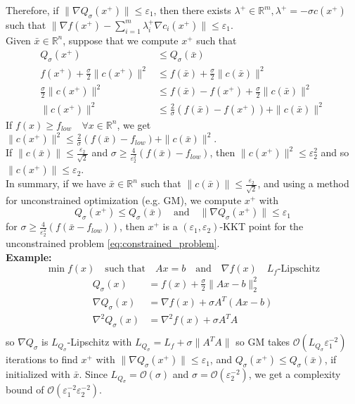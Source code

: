 \documentclass[12pt, openany]{report}
\newcommand{\R}{\mathbb{R}}
\renewcommand{\O}{\mathcal{O}}
\theoremstyle{definition}
\begin{document}
Therefore, if $\| \nabla Q_{\sigma} (x^+) \| \leq \varepsilon_1$, then there exists $\lambda^+ \in \R^m, \lambda^+ = - \sigma c(x^+)$ such that $\|\nabla f(x^+) - \displaystyle \sum_{i=1}^{m} \lambda_i^+ \nabla c_i(x^+)\| \leq \varepsilon_1$.\\
Given $\bar{x} \in \R^n$, suppose that we compute $x^+$ such that
\begin{equation}
	\begin{aligned}
		Q_\sigma(x^+) &\leq Q_\sigma(\bar{x})\\
		f(x^+) + \frac{\sigma}{2} \|c(x^+)\|^2 &\leq f(\bar{x}) + \frac{\sigma}{2} \|c(\bar{x})\|^2\\
		\frac{\sigma}{2} \|c(x^+)\|^2 &\leq f(\bar{x}) - f(x^+) + \frac{\sigma}{2} \|c(\bar{x})\|^2\\
		\|c(x^+)\|^2 &\leq \frac{2}{\sigma} \left( f(\bar{x}) - f(x^+) \right) + \|c(\bar{x})\|^2
	\end{aligned}
\end{equation}
If $f(x) \geq f_{low} \quad \forall x \in \R^n$, we get $\|c(x^+)\|^2 \leq \frac{2}{\sigma} (f(\bar{x}) - f_{low}) + \|c(\bar{x})\|^2$.\\
If $\|c(\bar{x})\| \leq \frac{\varepsilon_2}{\sqrt{2}}$ and $\sigma \geq \frac{4}{\varepsilon_2^2} (f(\bar{x})-f_{low})$, then $\|c(x^+)\|^2 \leq \varepsilon_2^2$ and so $\|c(x^+)\| \leq \varepsilon_2$.\\
In summary, if we have $\bar{x} \in \R^n$ such that $\|c(\bar{x})\| \leq \frac{\varepsilon_2}{\sqrt{2}}$, and using a method for unconstrained optimization (e.g. GM), we compute $x^+$ with
\begin{equation}
	Q_\sigma(x^+) \leq Q_\sigma(\bar{x}) \quad \text{and} \quad \|\nabla Q_\sigma(x^+)\| \leq \varepsilon_1
\end{equation}
for $\sigma \geq \frac{4}{\varepsilon_2^2} (f(\bar{x}-f_{low}))$, then $x^+$ is a $(\varepsilon_1,\varepsilon_2)$-KKT point for the unconstrained problem \eqref{eq:constrained_problem}.\\
\newline
\textbf{Example:}
\begin{equation}
	\min f(x) \quad \text{such that} \quad Ax=b  \quad \text{and} \quad \nabla f(x)  \quad L_f \text{-Lipschitz}
\end{equation}
\begin{equation}
	\begin{aligned}
		Q_{\sigma}(x) &= f(x) + \frac{\sigma}{2} \|Ax-b\|_2^2\\
		\nabla Q_{\sigma}(x) &= \nabla f(x) + \sigma A^T(Ax-b)\\
		\nabla^2 Q_{\sigma}(x) &= \nabla^2 f(x) + \sigma A^TA\\
	\end{aligned}
\end{equation}
so $\nabla Q_\sigma$ is $L_{Q_\sigma}$-Lipschitz with $L_{Q_\sigma} = L_f + \sigma \|A^TA\|$ so GM takes $\O (L_{Q_\sigma} \varepsilon_1^{-2})$ iterations to find $x^+$ with $\|\nabla Q_\sigma(x^+)\| \leq \varepsilon_1$, and $Q_\sigma (x^+) \leq Q_\sigma(\bar{x})$, if initialized with $\bar{x}$. Since $L_{Q_\sigma}=\O(\sigma)$ and $\sigma = \O(\varepsilon_2^{-2})$, we get a complexity bound of $\O(\varepsilon_1^{-2}\varepsilon_2^{-2})$.
\end{document}
